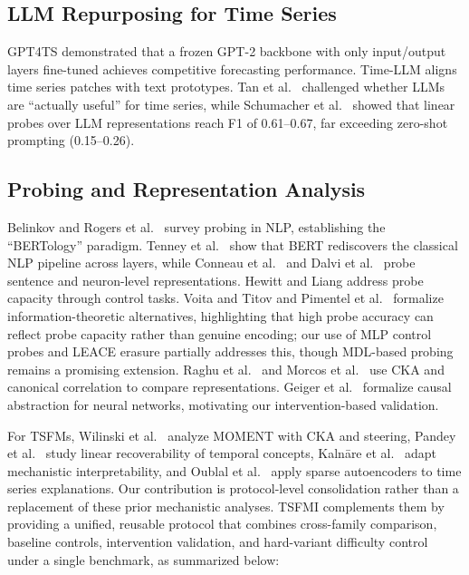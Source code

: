 \documentclass{article}
\begin{document}
\subsection{LLM Repurposing for Time Series}

GPT4TS \cite{Zhou2023} demonstrated that a frozen GPT-2 backbone with only input/output layers fine-tuned achieves competitive forecasting performance. Time-LLM \cite{Jin2024} aligns time series patches with text prototypes. Tan et al.\ \cite{Tan2024} challenged whether LLMs are ``actually useful'' for time series, while Schumacher et al.\ \cite{Schumacher2026} showed that linear probes over LLM representations reach F1 of 0.61--0.67, far exceeding zero-shot prompting (0.15--0.26).

\subsection{Probing and Representation Analysis}

Belinkov \cite{Belinkov2022} and Rogers et al.\ \cite{Rogers2021} survey probing in NLP, establishing the ``BERTology'' paradigm. Tenney et al.\ \cite{Tenney2019} show that BERT rediscovers the classical NLP pipeline across layers, while Conneau et al.\ \cite{Conneau2018} and Dalvi et al.\ \cite{Dalvi2019} probe sentence and neuron-level representations. Hewitt and Liang \cite{HewittLiang2019} address probe capacity through control tasks. Voita and Titov \cite{Voita2020} and Pimentel et al.\ \cite{Pimentel2020} formalize information-theoretic alternatives, highlighting that high probe accuracy can reflect probe capacity rather than genuine encoding; our use of MLP control probes and LEACE erasure partially addresses this, though MDL-based probing remains a promising extension. Raghu et al.\ \cite{Raghu2021} and Morcos et al.\ \cite{Morcos2018} use CKA and canonical correlation to compare representations. Geiger et al.\ \cite{Geiger2021} formalize causal abstraction for neural networks, motivating our intervention-based validation.

For TSFMs, Wilinski et al.\ \cite{Wilinski2025} analyze MOMENT with CKA and steering, Pandey et al.\ \cite{Pandey2025} study linear recoverability of temporal concepts, Kaln\={a}re et al.\ \cite{Kalnare2025} adapt mechanistic interpretability, and Oublal et al.\ \cite{Oublal2026} apply sparse autoencoders to time series explanations. Our contribution is protocol-level consolidation rather than a replacement of these prior mechanistic analyses. TSFMI complements them by providing a unified, reusable protocol that combines cross-family comparison, baseline controls, intervention validation, and hard-variant difficulty control under a single benchmark, as summarized below:
\end{document}
